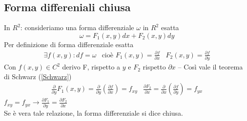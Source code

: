\subsection{Forma differeniali chiusa}
In $R^2$: consideriamo una forma differenziale $\omega$ in $R^2$ esatta
\begin{equation*}
	\omega=F_1(x,y)dx+F_2(x,y)dy
\end{equation*}
Per definizione di forma differenziale esatta
\begin{eqnarray*}
	\exists f(x,y):df=\omega& \text{cioè } F_1(x,y)=\frac{\partial f}{\partial
	x} & F_2(x,y)=\frac{\partial f}{\partial y}
\end{eqnarray*}
Con $f(x,y)\in C^2$ derivo F, rispetto a $y$ e $F_2$ rispetto $\partial x$ -- 
Così vale il teorema di Schwarz (\ref{Schwarz})
\begin{eqnarray*}
	\frac{\partial}{\partial y}F_1(x,y)=\frac{\partial}{\partial
	y}\left(\frac{\partial f}{\partial x}\right) =f_{xy} &\frac{\partial
	F_2}{\partial x}=\frac{\partial}{\partial x} \left(\frac{\partial
	f}{\partial y}\right)=f_{yx}
\end{eqnarray*}
$f_{xy}=f_{yx}\to \frac{\partial F_1}{\partial y}=\frac{\partial F_2}{\partial
x}$ \\
Se è vera tale relazione, la forma differenziale si dice {\color{red}chiusa}.
